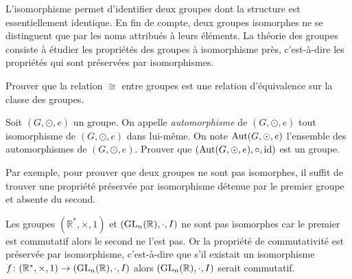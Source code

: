\documentclass[french,course,oneside,theoremnosection]{lecture}
\newcommand{\R}{\mathbb{R}}
\begin{document}
L'isomorphisme permet d'identifier deux groupes dont la structure est essentiellement identique. En fin de compte, deux groupes isomorphes ne se distinguent que par les noms attribués à leurs éléments. La théorie des groupes consiste à étudier les propriétés des groupes à isomorphisme près, c'est-à-dire les propriétés qui sont préservées par isomorphismes. 

\begin{exercise}
Prouver que la relation $\cong$ entre groupes est une relation d'équivalence sur la classe des groupes.
\end{exercise}

\begin{exercise}
Soit $(G, \odot, e)$ un groupe. On appelle \emph{automorphisme} de $(G, \odot, e)$ tout isomorphisme de $(G, \odot, e)$ dans lui-même. On note $\operatorname{Aut}(G, \odot, e)$ l'ensemble des automorphismes de $(G, \odot, e)$. Prouver que $(\operatorname{Aut}(G, \odot, e), \circ,  \operatorname{id})$ est un groupe.
\end{exercise}


Par exemple, pour prouver que deux groupes ne sont pas isomorphes, il suffit de trouver une propriété préservée par isomorphisme détenue par le premier groupe et absente du second.

\begin{example}
Les groupes $(\R^*, \times, 1)$ et $(\GL_n(\R), \cdot, I)$ ne sont pas isomorphes car le premier est commutatif alors le second ne l'est pas. Or la propriété de commutativité est préservée par isomorphisme, c'est-à-dire que s'il existait un isomorphisme $f\colon(\R^*, \times, 1) \to (\GL_n(\R), \cdot, I)$ alors $(\GL_n(\R), \cdot, I)$ serait commutatif.
\end{example}
\end{document}
